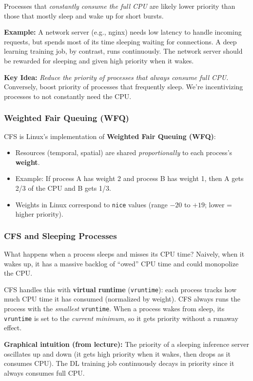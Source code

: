 \documentclass[11pt]{article}
\begin{document}
Processes that \emph{constantly consume the full CPU} are likely lower priority than those that mostly sleep and wake up for short bursts.

\textbf{Example:} A network server (e.g., nginx) needs low latency to handle incoming requests, but spends most of its time sleeping waiting for connections. A deep learning training job, by contrast, runs continuously. The network server should be rewarded for sleeping and given high priority when it wakes.

\textbf{Key Idea:} \emph{Reduce the priority of processes that always consume full CPU.} Conversely, boost priority of processes that frequently sleep. We're incentivizing processes to not constantly need the CPU.

\subsubsection*{Weighted Fair Queuing (WFQ)}

CFS is Linux's implementation of \textbf{Weighted Fair Queuing (WFQ)}:
\begin{itemize}
    \item Resources (temporal, spatial) are shared \emph{proportionally} to each process's \textbf{weight}.
    \item Example: If process A has weight 2 and process B has weight 1, then A gets 2/3 of the CPU and B gets 1/3.
    \item Weights in Linux correspond to \texttt{nice} values (range $-20$ to $+19$; lower = higher priority).
\end{itemize}

\subsubsection*{CFS and Sleeping Processes}

What happens when a process sleeps and misses its CPU time? Naively, when it wakes up, it has a massive backlog of ``owed'' CPU time and could monopolize the CPU.

CFS handles this with \textbf{virtual runtime} (\texttt{vruntime}): each process tracks how much CPU time it has consumed (normalized by weight). CFS always runs the process with the \emph{smallest} \texttt{vruntime}. When a process wakes from sleep, its \texttt{vruntime} is set to the \emph{current minimum}, so it gets priority without a runaway effect.

\textbf{Graphical intuition (from lecture):} The priority of a sleeping inference server oscillates up and down (it gets high priority when it wakes, then drops as it consumes CPU). The DL training job continuously decays in priority since it always consumes full CPU.
\end{document}
